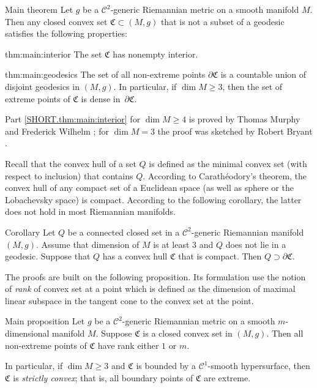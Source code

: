 \documentclass[a4paper,10pt]{article}
\begin{document}
\begin{thm}{Main theorem}\label{thm:main}
Let $g$ be a $\mathcal C^2$-generic Riemannian metric on a smooth manifold $M$.
Then any closed convex set $\mathfrak{C}\subset (M,g)$ that is not a subset of a geodesic
satisfies the following properties:

\begin{subthm}{thm:main:interior}
The set $\mathfrak{C}$ has nonempty interior.
\end{subthm}

\begin{subthm}{thm:main:geodesics}
The set of all non-extreme points $\partial\mathfrak{C}$ is a countable union of disjoint geodesics in $(M,g)$.
In particular, if $\dim M\ge 3$, then the set of
extreme points of $\mathfrak{C}$ is dense in~$\partial\mathfrak{C}$.
\end{subthm}

\end{thm}

Part \ref{SHORT.thm:main:interior} for $\dim M\ge 4$ is proved by Thomas Murphy and Frederick Wilhelm \cite{Wilhelm};
for $\dim M=3$ the proof was sketched by Robert Bryant \cite{Bryant}.

Recall that the convex hull of a set $Q$ is defined as the minimal convex set (with respect to inclusion) that contains $Q$.
According to Carathéodory's theorem, the convex hull of  any compact set of a Euclidean space (as well as sphere or the Lobachevsky space) is compact.
According to the following corollary, the latter does not hold in most Riemannian manifolds.

\begin{thm}{Corollary}\label{cor:caratheodory}
Let $Q$ be a connected closed set in a $\mathcal C^2$-generic Riemannian manifold $(M,g)$.
Assume that dimension of $M$ is at least $3$ and $Q$ does not lie in a geodesic.
Suppose that  $Q$ has a convex hull $\mathfrak{C}$ that is compact.
Then $Q\supset \partial \mathfrak{C}$.
\end{thm}

The proofs are built on the following proposition.
Its formulation use the notion of \emph{rank} of convex set at a point which is defined as the dimension of maximal linear subspace in the tangent cone to the convex set at the point.

\begin{thm}{Main proposition}\label{prom:rank}
Let $g$ be a $\mathcal C^2$-generic Riemannian metric on a smooth $m$-dimensional manifold $M$.
Suppose $\mathfrak{C}$ is a closed convex set in $(M,g)$.
Then all non-extreme points of $\mathfrak{C}$ have rank either $1$ or $m$.

In particular, if $\dim M\ge 3$ and $\mathfrak{C}$ is bounded by a $\mathcal{C}^1$-smooth hypersurface, then $\mathfrak{C}$ is \emph{strictly convex};
that is, all boundary points of $\mathfrak{C}$ are extreme.
\end{thm}
\end{document}
